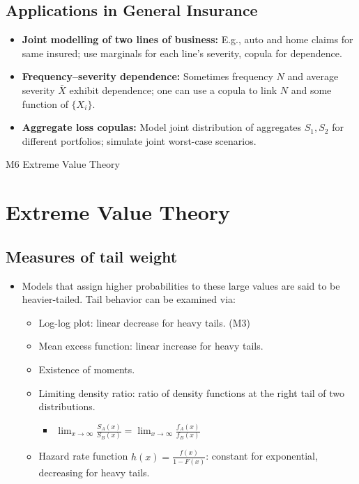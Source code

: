 \documentclass{article}
\begin{document}
\subsection{Applications in General Insurance}
\begin{itemize}
  \item \textbf{Joint modelling of two lines of business:} E.g., auto and home claims for same insured; use marginals for each line’s severity, copula for dependence.
  \item \textbf{Frequency–severity dependence:} Sometimes frequency \(N\) and average severity \(\bar{X}\) exhibit dependence; one can use a copula to link \(N\) and some function of \(\{X_i\}\).
  \item \textbf{Aggregate loss copulas:} Model joint distribution of aggregates \(S_1,S_2\) for different portfolios; simulate joint worst-case scenarios.
\end{itemize}


\pagebreak

\begin{center}
    \Large{M6 Extreme Value Theory}
\end{center}
    

\section{Extreme Value Theory}

\subsection{Measures of tail weight}

\begin{itemize}
    \item Models that assign higher probabilities to these large values are said to be heavier-tailed. Tail behavior can be examined via:
    \begin{itemize}
        \item Log-log plot: linear decrease for heavy tails. (M3)
        \item Mean excess function: linear increase for heavy tails.
        \item Existence of moments.
        \item Limiting density ratio: ratio of density functions at the right tail of two distributions.
        \begin{itemize}
            \item $\lim_{x \rightarrow \infty} \frac{S_A(x)}{S_B(x)}=\lim_{x \rightarrow \infty} \frac{f_A(x)}{f_B(x)}$
        \end{itemize}
        \item Hazard rate function $h(x) = \frac{f(x)}{1 - F(x)}$: constant for exponential, decreasing for heavy tails.
    \end{itemize}
\end{itemize}
\end{document}
